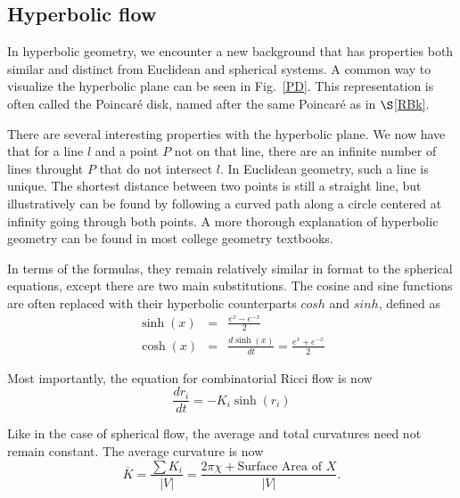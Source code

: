 \documentclass[12pt]{article}
\begin{document}
\subsection{Hyperbolic flow}

In hyperbolic geometry, we encounter a new background that has properties both similar and distinct from Euclidean and spherical systems. A common way to visualize the hyperbolic plane can be seen in Fig.~\ref{PD}. This representation is often called the Poincar\'{e} disk, named after the same Poincar\'{e} as in $\S$\ref{RBk}.\newline

\noindent There are several interesting properties with the hyperbolic plane. We now have that for a line $l$ and a point $P$ not on that line, there are an infinite number of lines throught $P$ that do not intersect $l$. In Euclidean geometry, such a line is unique. The shortest distance between two points is still a straight line, but illustratively can be found by following a curved path along a circle centered at infinity going through both points. A more thorough explanation of hyperbolic geometry can be found in most college geometry textbooks.\newline

\noindent In terms of the formulas, they remain relatively similar in format to the spherical equations, except there are two main substitutions. The cosine and sine functions are often replaced with their hyperbolic counterparts $cosh$ and $sinh$, defined as
\begin{eqnarray*}
\sinh(x) &=& \frac{e^x - e^{-x}}{2}\\
\cosh(x) &=& \frac{d\sinh(x)}{dt} = \frac{e^x + e^{-x}}{2}
\end{eqnarray*}

\noindent Most importantly, the equation for combinatorial Ricci flow is now
\begin{equation}
\label{HRiccif}
\frac{dr_i}{dt} = -K_i\sinh(r_i)
\end{equation}
\noindent 

\noindent Like in the case of spherical flow, the average and total curvatures need not remain constant. The average curvature is now
$$\overline{K} = \frac{\sum{K_i}}{|V|} = \frac{2\pi\chi + \mbox{Surface Area of }X}{|V|}.$$
\end{document}
